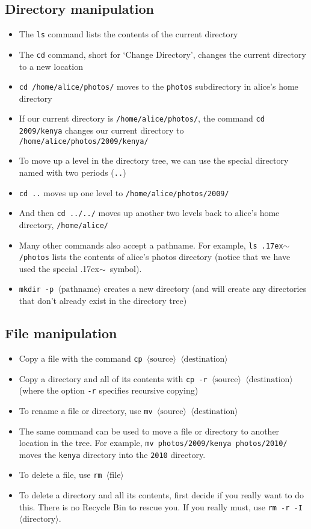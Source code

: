 \documentclass[a4paper,twoside]{memoir}
\newcommand{\shellcmd}{\texttt}
\newcommand{\shellvar}[1]{$\langle \text{#1}\rangle$}
\newcommand{\home}{\raise.17ex\hbox{$\scriptstyle\mathtt{\sim}$}}
\begin{document}
\subsection{Directory manipulation}
\begin{itemize}
\item The \shellcmd{ls} command lists the contents of the current directory
\item The \shellcmd{cd} command, short for `Change Directory', changes the current directory to a new location
\item \shellcmd{cd /home/alice/photos/} moves to the \shellcmd{photos} subdirectory in alice's home directory
\item If our current directory is \shellcmd{/home/alice/photos/}, the command \shellcmd{cd 2009/kenya} changes our current directory to \shellcmd{/home/alice/photos/2009/kenya/}
\item To move up a level in the directory tree, we can use the special directory named with two periods (\shellcmd{..})
\item \shellcmd{cd ..} moves up one level to \shellcmd{/home/alice/photos/2009/}
\item And then \shellcmd{cd ../../} moves up another two levels back to alice's home directory, \shellcmd{/home/alice/}
\item Many other commands also accept a pathname.  For example, \shellcmd{ls \home/photos} lists the contents of alice's photos directory (notice that we have used the special \home\ symbol).
\item \shellcmd{mkdir -p \shellvar{pathname}} creates a new directory (and will create any directories that don't already exist in the directory tree)
\end{itemize}

\subsection{File manipulation}
\begin{itemize}
\item Copy a file with the command \shellcmd{cp \shellvar{source} \shellvar{destination}}
\item Copy a directory and all of its contents with \shellcmd{cp -r \shellvar{source} \shellvar{destination}} (where the option \shellcmd{-r} specifies recursive copying)
\item To rename a file or directory, use \shellcmd{mv \shellvar{source} \shellvar{destination}}
\item The same command can be used to move a file or directory to another location in the tree.  For example, \shellcmd{mv photos/2009/kenya photos/2010/} moves the \shellcmd{kenya} directory into the \shellcmd{2010} directory.
\item To delete a file, use \shellcmd{rm \shellvar{file}}
\item To delete a directory and all its contents, first decide if you really want to do this.  There is no Recycle Bin to rescue you.  If you really must, use \shellcmd{rm -r -I \shellvar{directory}}.
\end{itemize}
\end{document}
